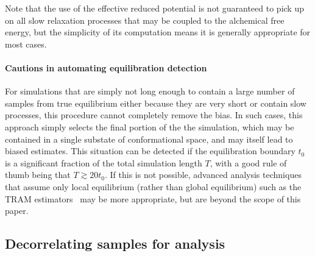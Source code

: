 \documentclass[9pt,bestpractices]{livecoms}
\begin{document}
Note that the use of the effective reduced potential is not guaranteed to pick up on all slow relaxation processes that may be coupled to the alchemical free energy, but the simplicity of its computation means it is generally appropriate for most cases.

\paragraph{Cautions in automating equilibration detection}
For simulations that are simply not long enough to contain a large number of samples from true equilibrium either because they are very short or contain slow processes, this procedure cannot completely remove the bias.
In such cases, this approach simply selects the final portion of the the simulation, which may be contained in a single substate of conformational space, and may itself lead to biased estimates. 
This situation can be detected if the equilibration boundary $t_0$ is a significant fraction of the total simulation length $T$, with a good rule of thumb being that $T \gtrsim 20 t_0$.
If this is not possible, advanced analysis techniques that assume only local equilibrium (rather than global equilibrium) such as the TRAM estimators~\cite{mey2014xtram,wu2016multiensemble,nuske2017markov} may be more appropriate, but are beyond the scope of this paper. 

\subsection{Decorrelating samples for analysis}
\label{sec:decorrelating-samples}
\end{document}

